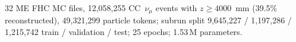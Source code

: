 32 ME FHC MC files, 12{,}058{,}255 CC~$\nu_\mu$ events with $z \ge 4000$~mm (39.5\% reconstructed), 49{,}321{,}299 particle tokens; subrun split 9{,}645{,}227 / 1{,}197{,}286 / 1{,}215{,}742 train / validation / test; 25 epochs; 1.53\,M parameters.

